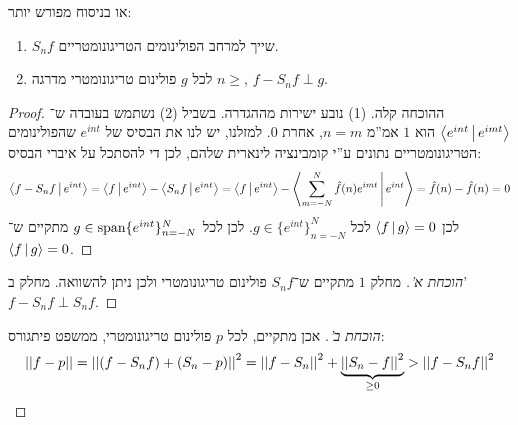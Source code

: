 \documentclass[]{../../../../tex/classes/styledArticle}
\begin{document}
	או בניסוח מפורש יותר: 
	\begin{enumerate}[(1)]
		\item $S_nf$ שייך למרחב הפולינומים הטריגונומטריים. 
		\item לכל $g$ פולינום טריגונומטרי מדרגה $n \ge$, $f - S_nf \perp g$. 
	\end{enumerate}
	\begin{proof}
		ההוכחה קלה. (1) נובע ישירות מההגדרה. בשביל (2) נשתמש בעובדה ש־$\left \langle e^{int} \,\middle|\, e^{imt} \right \rangle$ הוא $1$ אמ''מ $n = m$, אחרת $0$. למזלנו, יש לנו את הבסיס של $e^{int}$ שהפולינומים הטריגונומטריים נתונים ע''י קומבינציה לינארית שלהם, לכן די להסתכל על איברי הבסיס: 
		\[ \left \langle f - S_nf \,\middle|\, e^{int} \right \rangle = \left \langle f \,\middle|\, e^{int} \right \rangle - \left \langle S_nf \,\middle|\, e^{int} \right \rangle = \left \langle f \,\middle|\, e^{int} \right \rangle - \left \langle \sum_{m = -N}^{N}\hat f(n)e^{imt} \,\middle|\, e^{int} \right \rangle = \hat f(n) - \hat f(n) = 0 \]
		לכן $\left \langle f \,\middle|\, g \right \rangle = 0$ לכל $g \in \{e^{int}\}_{n = -N}^{N}$. לכן לכל $g \in \operatorname{span}\{e^{int}\}_{n = -N}^{N}$ מתקיים ש־$\left \langle f \,\middle|\, g \right \rangle = 0$. 
	\end{proof}
	\begin{proof}[הוכחת א']
		מחלק $1$ מתקיים ש־$S_nf$ פולינום טריגונומטרי ולכן ניתן להשוואה. מחלק ב' $f - S_nf \perp S_nf$. 
	\end{proof}\begin{proof}[הוכחת ב']
		אכן מתקיים, לכל $p$ פולינום טריגונומטרי, ממשפט פיתגורס:
		\[ \left \vert \left \vert f - p \right \vert \right \vert = \left \vert \left \vert (f - S_nf) + (S_n - p) \right \vert \right \vert^{2} = \left \vert \left \vert f - S_n \right \vert \right \vert^{2} + \underbrace{\left \vert \left \vert S_n - f \right \vert \right \vert^{2}}_{\ge 0} > \left \vert \left \vert f - S_nf \right \vert \right \vert^{2} \]
	\end{proof}
\end{document}
